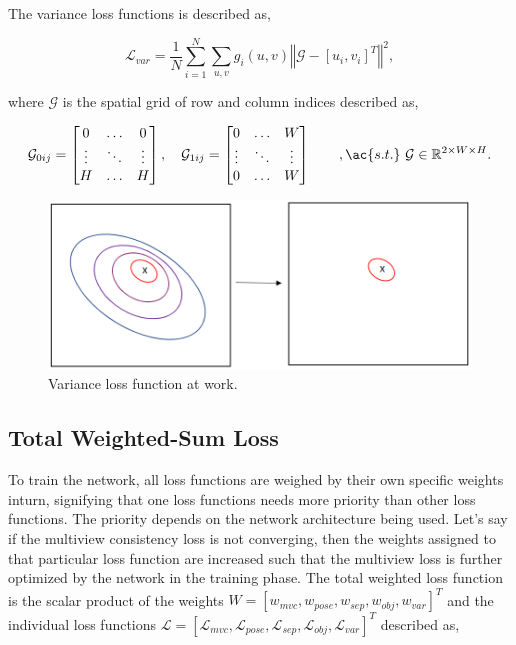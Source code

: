 The variance loss functions is described as,

\begin{equation}
    \mathcal{L}_{var} = \dfrac{1}{N} \displaystyle\sum^N_{i=1} \displaystyle\sum_{u, v} g_i(u, v) \left\Vert \mathcal{G} - [u_i, v_i]^T \right\Vert^2,
\end{equation}

where $\mathcal{G}$ is the spatial grid of row and column indices described as,

\begin{equation}
    \label{eqn:spatial_grid}
    \mathcal{G}_{0ij} = \begin{bmatrix}
        0      & \dots  & 0      \\
        \vdots & \ddots & \vdots \\
        H      & \dots  & H
    \end{bmatrix}, \quad
    \mathcal{G}_{1ij} = \begin{bmatrix}
        0      & \dots  & W      \\
        \vdots & \ddots & \vdots \\
        0      & \dots  & W
    \end{bmatrix} \quad \quad,\ac{s.t.} \ \mathcal{G}  \in \mathbb{R}^{2 \times W \times H}.
\end{equation}

\begin{figure}[htb]
    \centering
    \caption{Variance loss function at work.}
    \label{fig:var_loss}
    \includegraphics[scale=0.15]{images/keypointnet/var_loss.png}
\end{figure}

\subsection{Total Weighted-Sum Loss}

To train the network, all loss functions are weighed by their own specific weights inturn, signifying that one loss functions needs more priority than other loss functions.
The priority depends on the network architecture being used. Let's say if the multiview consistency loss is not converging, then the weights assigned to that particular loss function
are increased such that the multiview loss is further optimized by the network in the training phase. The total weighted loss function is the scalar product of the weights $W = [w_{mvc}, w_{pose}, w_{sep}, w_{obj}, w_{var}]^T $ and the individual
loss functions $ \mathcal{L} = [\mathcal{L}_{mvc}, \mathcal{L}_{pose}, \mathcal{L}_{sep}, \mathcal{L}_{obj}, \mathcal{L}_{var}]^T$ described as,

